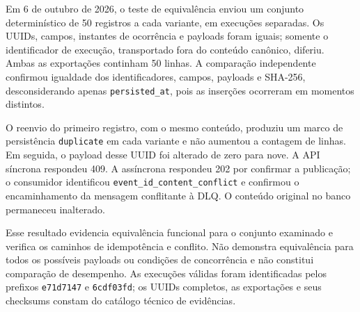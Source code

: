 Em 6 de outubro de 2026, o teste de equivalência enviou um conjunto determinístico de 50 registros a cada variante, em execuções separadas. Os UUIDs, campos, instantes de ocorrência e payloads foram iguais; somente o identificador de execução, transportado fora do conteúdo canônico, diferiu. Ambas as exportações continham 50 linhas. A comparação independente confirmou igualdade dos identificadores, campos, payloads e SHA-256, desconsiderando apenas \texttt{persisted\_at}, pois as inserções ocorreram em momentos distintos.

O reenvio do primeiro registro, com o mesmo conteúdo, produziu um marco de persistência \texttt{duplicate} em cada variante e não aumentou a contagem de linhas. Em seguida, o payload desse UUID foi alterado de zero para nove. A API síncrona respondeu 409. A assíncrona respondeu 202 por confirmar a publicação; o consumidor identificou \texttt{event\_id\_content\_conflict} e confirmou o encaminhamento da mensagem conflitante à DLQ. O conteúdo original no banco permaneceu inalterado.

Esse resultado evidencia equivalência funcional para o conjunto examinado e verifica os caminhos de idempotência e conflito. Não demonstra equivalência para todos os possíveis payloads ou condições de concorrência e não constitui comparação de desempenho. As execuções válidas foram identificadas pelos prefixos \texttt{e71d7147} e \texttt{6cdf03fd}; os UUIDs completos, as exportações e seus checksums constam do catálogo técnico de evidências.
